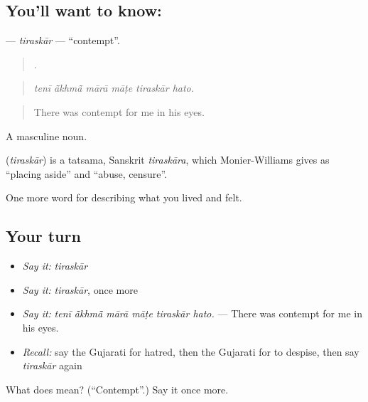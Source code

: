 \subsection*{You'll want to know: }
\textbf{} — \emph{tiraskār} — \textquotedblleft{}contempt\textquotedblright{}.

\begin{quote}
     .
\end{quote}

\begin{quote}
\emph{tenī ā̃khmā̃ mārā māṭe tiraskār hato.}
\end{quote}

\begin{quote}
There was contempt for me in his eyes.
\end{quote}

A masculine noun.

\begin{cousinweb}
\textbf{} (\emph{tiraskār}) is a tatsama, Sanskrit \emph{tiraskāra}, which Monier-Williams gives as \textquotedblleft{}placing aside\textquotedblright{} and \textquotedblleft{}abuse, censure\textquotedblright{}.
\end{cousinweb}

\begin{grammarlens}[title={What you've built}]
One more word for describing what you lived and felt.
\end{grammarlens}

\subsection*{Your turn}
\begin{itemize}
\raggedright
  \item \emph{Say it:} \emph{tiraskār}
  \item \emph{Say it:} \emph{tiraskār}, once more
  \item \emph{Say it:} \emph{tenī ā̃khmā̃ mārā māṭe tiraskār hato.} — There was contempt for me in his eyes.
  \item \emph{Recall:} say the Gujarati for hatred, then the Gujarati for to despise, then say \emph{tiraskār} again
\end{itemize}

\begin{tcolorbox}[breakable,colback=teal!4,colframe=teal!35!black,title={Before you move on}]
What does  mean? (\textquotedblleft{}Contempt\textquotedblright{}.) Say it once more.
\end{tcolorbox}
